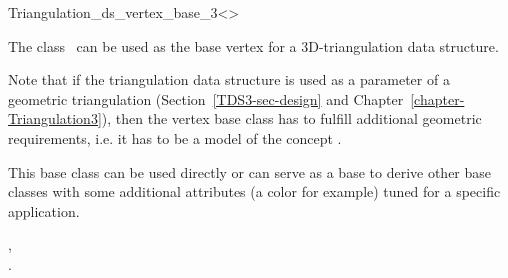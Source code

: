 

\begin{ccRefClass}{Triangulation_ds_vertex_base_3<>}


\ccDefinition

The class \ccRefName\ can be used as the base vertex for a 3D-triangulation
data structure.

Note that if the triangulation data structure is used as a parameter of a
geometric triangulation (Section~\ref{TDS3-sec-design} and
Chapter~\ref{chapter-Triangulation3}), then the vertex base class has to
fulfill additional geometric requirements, i.e. it has to be a model of the
concept .

This base class can be used directly or can serve as a base to derive
other base classes with some additional attributes (a color for
example) tuned for a specific application.


\ccIsModel


\ccSeeAlso

,\\
.



\end{ccRefClass}


